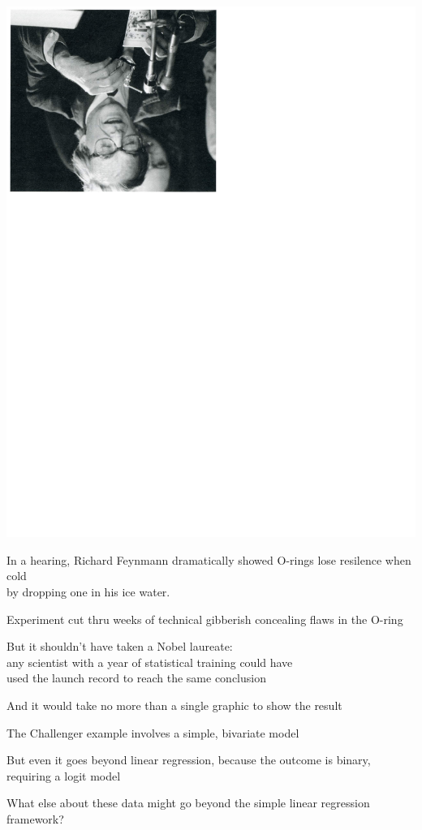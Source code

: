 \documentclass[pdflatex,landscape,titlepage]{foils}
\begin{document}
\begin{center}
\includegraphics[width=4.5 in,angle=180]{feynnman}
\end{center}


In a hearing, Richard Feynmann dramatically showed O-rings lose resilence when cold\\
by dropping one in his ice water.

Experiment cut thru weeks of technical gibberish concealing flaws in the O-ring

But it shouldn't have taken a Nobel laureate: \\ 
any scientist with a year of statistical training could have \\
used the launch record to reach the same conclusion

And it would take no more than a single graphic to show the result


\bgclear

The Challenger example involves a simple, bivariate model

But even it goes beyond linear regression, because the outcome is binary, requiring a logit model

What else about these data might go beyond the simple linear regression framework?
\end{document}
